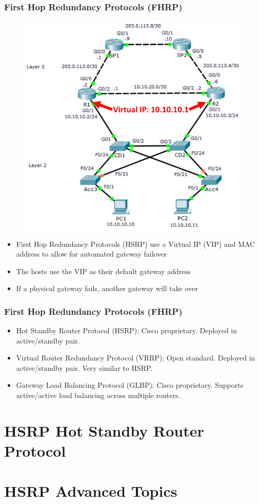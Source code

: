 \documentclass[pdflatex,compress,mathserif]{beamer}
\begin{document}
\begin{frame}
	\frametitle{First Hop Redundancy Protocols (FHRP)}
	\begin{multicols}{2}
		\begin{figure}
			\centering
			\includegraphics[width=\linewidth]{img/img10}
		\end{figure}
		\columnbreak
		\begin{itemize}
			\item First Hop Redundancy Protocols
(HSRP) use a Virtual IP (VIP) and
MAC address to allow for
automated gateway failover
			\item The hosts use the VIP as their
default gateway address
			\item If a physical gateway fails, another
gateway will take over
		\end{itemize}
	\end{multicols}
\end{frame}

\begin{frame}
	\frametitle{First Hop Redundancy Protocols (FHRP)}
	\begin{itemize}
		\item Hot Standby Router Protocol (HSRP): Cisco proprietary. Deployed in
active/standby pair.
		\item Virtual Router Redundancy Protocol (VRRP): Open standard. Deployed
in active/standby pair. Very similar to HSRP.
		\item Gateway Load Balancing Protocol (GLBP): Cisco proprietary. Supports
active/active load balancing across multiple routers.
	\end{itemize}
\end{frame}

\section{HSRP Hot Standby Router Protocol}

\section{HSRP Advanced Topics}
\end{document}
